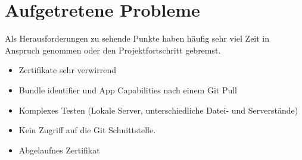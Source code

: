 \section{Aufgetretene Probleme}
Als Herausforderungen zu sehende Punkte haben häufig sehr viel Zeit in Anspruch genommen oder den Projektfortschritt gebremst.

\begin{itemize}
\item Zertifikate sehr verwirrend
\item Bundle identifier und App Capabilities nach einem Git Pull
\item Komplexes Testen (Lokale Server, unterschiedliche Datei- und Serverstände) 
\item Kein Zugriff auf die Git Schnittstelle.
\item Abgelaufnes Zertifikat
\end{itemize}

